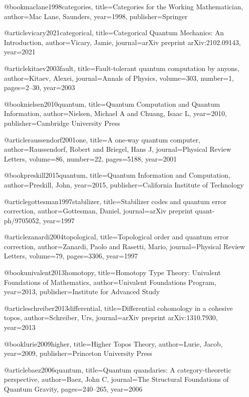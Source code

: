 @book{maclane1998categories,
  title={Categories for the Working Mathematician},
  author={Mac Lane, Saunders},
  year={1998},
  publisher={Springer}
}

@article{vicary2021categorical,
  title={Categorical Quantum Mechanics: An Introduction},
  author={Vicary, Jamie},
  journal={arXiv preprint arXiv:2102.09143},
  year={2021}
}

@article{kitaev2003fault,
  title={Fault-tolerant quantum computation by anyons},
  author={Kitaev, Alexei},
  journal={Annals of Physics},
  volume={303},
  number={1},
  pages={2--30},
  year={2003}
}

@book{nielsen2010quantum,
  title={Quantum Computation and Quantum Information},
  author={Nielsen, Michael A and Chuang, Isaac L},
  year={2010},
  publisher={Cambridge University Press}
}

@article{raussendorf2001one,
  title={A one-way quantum computer},
  author={Raussendorf, Robert and Briegel, Hans J},
  journal={Physical Review Letters},
  volume={86},
  number={22},
  pages={5188},
  year={2001}
}

@book{preskill2015quantum,
  title={Quantum Information and Computation},
  author={Preskill, John},
  year={2015},
  publisher={California Institute of Technology}
}

@article{gottesman1997stabilizer,
  title={Stabilizer codes and quantum error correction},
  author={Gottesman, Daniel},
  journal={arXiv preprint quant-ph/9705052},
  year={1997}
}

@article{zanardi2004topological,
  title={Topological order and quantum error correction},
  author={Zanardi, Paolo and Rasetti, Mario},
  journal={Physical Review Letters},
  volume={79},
  pages={3306},
  year={1997}
}

@book{univalent2013homotopy,
  title={Homotopy Type Theory: Univalent Foundations of Mathematics},
  author={{Univalent Foundations Program}},
  year={2013},
  publisher={Institute for Advanced Study}
}

@article{schreiber2013differential,
  title={Differential cohomology in a cohesive topos},
  author={Schreiber, Urs},
  journal={arXiv preprint arXiv:1310.7930},
  year={2013}
}

@book{lurie2009higher,
  title={Higher Topos Theory},
  author={Lurie, Jacob},
  year={2009},
  publisher={Princeton University Press}
}

@article{baez2006quantum,
  title={Quantum quandaries: A category-theoretic perspective},
  author={Baez, John C},
  journal={The Structural Foundations of Quantum Gravity},
  pages={240--265},
  year={2006}
}

